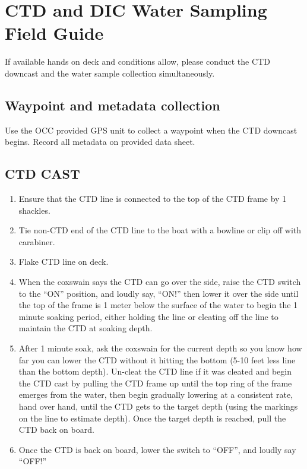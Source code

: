 \documentclass[]{book}
\providecommand{\tightlist}{%
  \setlength{\itemsep}{0pt}\setlength{\parskip}{0pt}}
\begin{document}
\hypertarget{water}{%
\chapter{CTD and DIC Water Sampling Field Guide}\label{water}}

If available hands on deck and conditions allow, please conduct the CTD downcast and the water sample collection simultaneously.

\hypertarget{waypoint-and-metadata-collection}{%
\section{Waypoint and metadata collection}\label{waypoint-and-metadata-collection}}

Use the OCC provided GPS unit to collect a waypoint when the CTD downcast begins. Record all metadata on provided data sheet.

\hypertarget{ctd-cast}{%
\section{CTD CAST}\label{ctd-cast}}

\begin{enumerate}
\def\labelenumi{\arabic{enumi}.}
\tightlist
\item
  Ensure that the CTD line is connected to the top of the CTD frame by 1 shackles.
\item
  Tie non-CTD end of the CTD line to the boat with a bowline or clip off with carabiner.
\item
  Flake CTD line on deck.
\item
  When the coxswain says the CTD can go over the side, raise the CTD switch to the ``ON'' position, and loudly say, ``ON!'' then lower it over the side until the top of the frame is 1 meter below the surface of the water to begin the 1 minute soaking period, either holding the line or cleating off the line to maintain the CTD at soaking depth.
\item
  After 1 minute soak, ask the coxswain for the current depth so you know how far you can lower the CTD without it hitting the bottom (5-10 feet less line than the bottom depth). Un-cleat the CTD line if it was cleated and begin the CTD cast by pulling the CTD frame up until the top ring of the frame emerges from the water, then begin gradually lowering at a consistent rate, hand over hand, until the CTD gets to the target depth (using the markings on the line to estimate depth). Once the target depth is reached, pull the CTD back on board.
\item
  Once the CTD is back on board, lower the switch to ``OFF'', and loudly say ``OFF!''
\end{enumerate}
\end{document}
